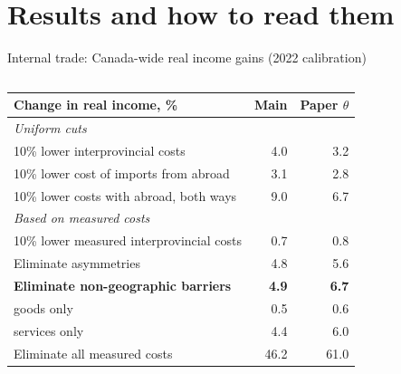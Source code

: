 \documentclass[aspectratio=169,9pt,t]{beamer}
\begin{document}
\section{Results and how to read them}

\begin{frame}{Internal trade: Canada-wide real income gains (2022 calibration)}
  \begin{columns}[T]
    \begin{column}{0.6\textwidth}
      \small
      \begin{tabular}{@{}L{0.6\textwidth}rr@{}}
        \toprule
        Change in real income, \% & Main & Paper $\theta$\\
        \midrule
        \emph{Uniform cuts}\\
        10\% lower interprovincial costs & 4.0 & 3.2\\
        10\% lower cost of imports from abroad & 3.1 & 2.8\\
        10\% lower costs with abroad, both ways & 9.0 & 6.7\\
        \addlinespace
        \emph{Based on measured costs}\\
        10\% lower measured interprovincial costs & 0.7 & 0.8\\
        Eliminate asymmetries & 4.8 & 5.6\\
        \textbf{Eliminate non-geographic barriers} & \textbf{4.9} & \textbf{6.7}\\
        \quad goods only & 0.5 & 0.6\\
        \quad services only & 4.4 & 6.0\\
        Eliminate all measured costs & 46.2 & 61.0\\
        \bottomrule
      \end{tabular}


\end{column}
\end{columns}
\end{frame}
\end{document}
